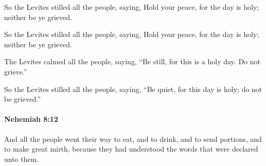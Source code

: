 			So the Levites stilled all the people, saying, Hold your peace, for the day is holy; neither be ye grieved.

			\begin{versebox}
					\item[BHS] 
					\item[LXX] 
					\item[ASV] So the Levites stilled all the people, saying, Hold your peace, for the day is holy; neither be ye grieved.
					\item[NIV] The Levites calmed all the people, saying, “Be still, for this is a holy day. Do not grieve.”
					\item[NRSV] So the Levites stilled all the people, saying, “Be quiet, for this day is holy; do not be grieved.”
			\end{versebox}

		\paragraph{Nehemiah 8:12} %
			\label{NEHEMIAH-8-12}

			And all the people went their way to eat, and to drink, and to send portions, and to make great mirth, because they had understood the words that were declared unto them.

